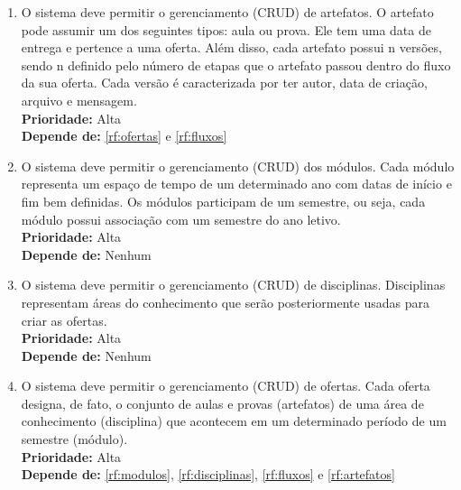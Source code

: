 \begin{enumerate}[label=\textbf{RF\protect\twodigits{\theenumi}}, leftmargin=2cm]
	\item \label{rf:artefatos} O sistema deve permitir o gerenciamento (CRUD) de artefatos. O artefato pode assumir um dos seguintes tipos: aula ou prova. Ele tem uma data de entrega e pertence a uma oferta. Além disso, cada artefato possui n versões, sendo n definido pelo número de etapas que o artefato passou dentro do fluxo da sua oferta. Cada versão é caracterizada por ter autor, data de criação, arquivo e mensagem. \\
		\textbf{Prioridade:} Alta \\
		\textbf{Depende de:} \hyperref[rf:ofertas]{\ref{rf:ofertas}} e \hyperref[rf:fluxos]{\ref{rf:fluxos}}
				
	\item \label{rf:modulos} O sistema deve permitir o gerenciamento (CRUD) dos módulos. Cada módulo representa um espaço de tempo de um determinado ano com datas de início e fim bem definidas. Os módulos participam de um semestre, ou seja, cada módulo possui associação com um semestre do ano letivo. \\
		\textbf{Prioridade:} Alta \\
		\textbf{Depende de:} Nenhum

	\item \label{rf:disciplinas} O sistema deve permitir o gerenciamento (CRUD) de disciplinas. Disciplinas representam áreas do conhecimento que serão posteriormente usadas para criar as ofertas. \\
		\textbf{Prioridade:} Alta \\
		\textbf{Depende de:} Nenhum
		
	\item \label{rf:ofertas} O sistema deve permitir o gerenciamento (CRUD) de ofertas. Cada oferta designa, de fato, o conjunto de aulas e provas (artefatos) de uma área de conhecimento (disciplina) que acontecem em um determinado período de um semestre (módulo). \\
		\textbf{Prioridade:} Alta \\
		\textbf{Depende de:} \hyperref[rf:modulos]{\ref{rf:modulos}}, \hyperref[rf:disciplinas]{\ref{rf:disciplinas}}, \hyperref[rf:fluxos]{\ref{rf:fluxos}} e \hyperref[rf:artefatos]{\ref{rf:artefatos}}
		

\end{enumerate}

